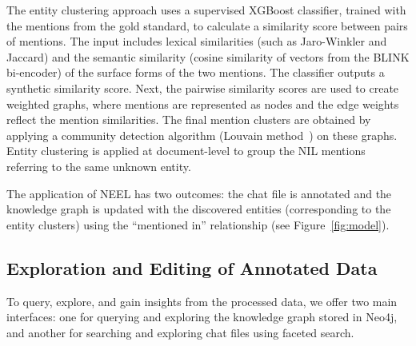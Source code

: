 The entity clustering approach uses a supervised XGBoost classifier, trained with the mentions from the gold standard, to calculate a similarity score between pairs of mentions. The input includes lexical similarities (such as Jaro-Winkler and Jaccard) and the semantic similarity (cosine similarity of vectors from the BLINK bi-encoder) of the surface forms of the two mentions. The classifier outputs a synthetic similarity score.
Next, the pairwise similarity scores are used to create weighted graphs, where mentions are represented as nodes and the edge weights reflect the mention similarities. The final mention clusters are obtained by applying a community detection algorithm (Louvain method~\cite{blondel2008fast})
on these graphs.
%
Entity clustering is applied at document-level to group the NIL mentions referring to the same unknown entity. %


The application of NEEL has two outcomes: the chat file is annotated
and the knowledge graph is updated with the discovered entities (corresponding to the entity clusters) using the ``mentioned in'' relationship (see Figure~\ref{fig:model}).


\subsection{Exploration and Editing of Annotated Data} \label{sec:exploration}


To query, explore, and gain insights from the processed data, we offer two main interfaces: one for querying and exploring the knowledge graph stored in Neo4j, and another for searching and exploring chat files using faceted search.




